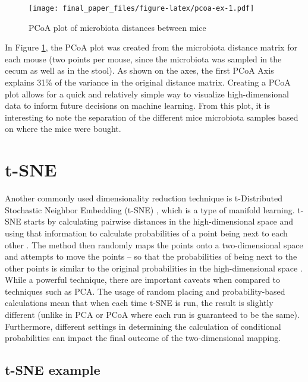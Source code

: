 \documentclass[12pt,openany]{book}
\begin{document}
\begin{figure}
\centering
\texttt{[image: final\_paper\_files/figure-latex/pcoa-ex-1.pdf]}
\caption{\label{fig:pcoa-ex}PCoA plot of microbiota distances between mice}
\end{figure}

In Figure \ref{fig:pcoa-ex}, the PCoA plot was created from the
microbiota distance matrix for each mouse (two points per mouse, since
the microbiota was sampled in the cecum as well as in the stool). As
shown on the axes, the first PCoA Axis explains 31\% of the variance in
the original distance matrix. Creating a PCoA plot allows for a quick
and relatively simple way to visualize high-dimensional data to inform
future decisions on machine learning. From this plot, it is interesting
to note the separation of the different mice microbiota samples based on
where the mice were bought.

\section{t-SNE}\label{t-sne}

Another commonly used dimensionality reduction technique is
t-Distributed Stochastic Neighbor Embedding (t-SNE)
\citep{maaten2008visualizing}, which is a type of manifold learning.
t-SNE starts by calculating pairwise distances in the high-dimensional
space and using that information to calculate probabilities of a point
being next to each other \citep{tsnejs}. The method then randomly maps
the points onto a two-dimensional space and attempts to move the points
-- so that the probabilities of being next to the other points is
similar to the original probabilities in the high-dimensional space
\citep{tsnejs}. While a powerful technique, there are important caveats
when compared to techniques such as PCA. The usage of random placing and
probability-based calculations mean that when each time t-SNE is run,
the result is slightly different (unlike in PCA or PCoA where each run
is guaranteed to be the same). Furthermore, different settings in
determining the calculation of conditional probabilities can impact the
final outcome of the two-dimensional mapping.

\subsection{t-SNE example}\label{t-sne-example}
\end{document}

